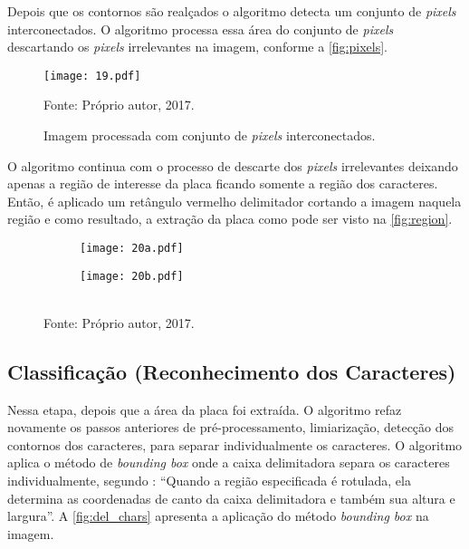 Depois que os contornos são realçados o algoritmo detecta um conjunto de \emph{pixels} interconectados. O algoritmo processa essa área do conjunto de \emph{pixels} descartando os \emph{pixels} irrelevantes na imagem, conforme a \autoref{fig:pixels}.

\begin{figure}[htb]
	\centering
	\caption{{\footnotesize Imagem processada com conjunto de \textit{pixels} interconectados.}}   %
	\label{fig:pixels}
	\texttt{[image: 19.pdf]}
	
	{\footnotesize Fonte: Próprio autor, 2017.}
\end{figure}

O algoritmo continua com o processo de descarte dos \emph{pixels} irrelevantes deixando apenas a região de interesse da placa ficando somente a região dos caracteres. Então, é aplicado um retângulo vermelho delimitador cortando a imagem naquela região e como resultado, a extração da placa como pode ser visto na \autoref{fig:region}.

\begin{figure}[htb]
	\centering
	\caption[\footnotesize Área de interesse da imagem.]{\footnotesize Área de interesse da imagem. a) Construção do retangulo vermelho sobre a região da placa; e b) Placa extraída da imagem.}   %
	\label{fig:region}
	\begin{subfigure}{.4\textwidth}
		\centering
		\texttt{[image: 20a.pdf]}
		\caption{ }
	\end{subfigure}
	\begin{subfigure}{.4\textwidth}
		\centering
		\texttt{[image: 20b.pdf]}
		\caption{ }
	\end{subfigure}
	\\
	{\footnotesize Fonte: Próprio autor, 2017.}
\end{figure}

\subsection{\textbf{Classificação (Reconhecimento dos Caracteres)}}

Nessa etapa, depois que a área da placa foi extraída. O algoritmo refaz novamente os passos anteriores de pré-processamento, limiarização, detecção dos contornos dos caracteres, para separar individualmente os caracteres. O algoritmo aplica o método de \textit{bounding box} onde a caixa delimitadora separa os caracteres individualmente, segundo : ``Quando a região especificada é rotulada, ela determina as coordenadas de canto da caixa delimitadora e também sua altura e largura''. A \autoref{fig:del_chars} apresenta a aplicação do método \textit{bounding box} na imagem.

